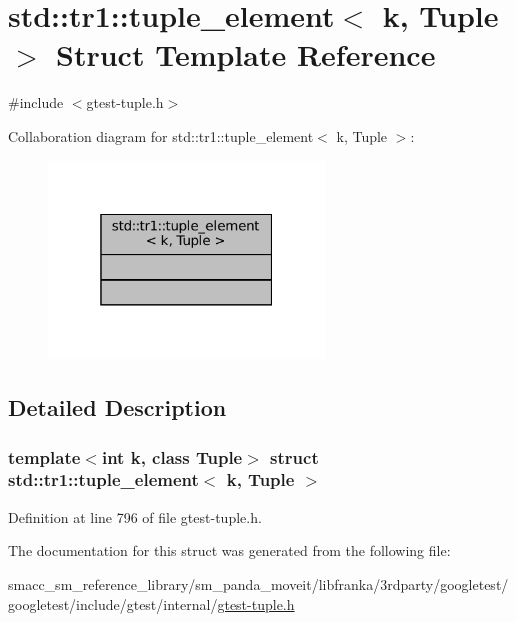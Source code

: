 \hypertarget{structstd_1_1tr1_1_1tuple__element}{}\section{std\+:\+:tr1\+:\+:tuple\+\_\+element$<$ k, Tuple $>$ Struct Template Reference}
\label{structstd_1_1tr1_1_1tuple__element}


{\ttfamily \#include $<$gtest-\/tuple.\+h$>$}



Collaboration diagram for std\+:\+:tr1\+:\+:tuple\+\_\+element$<$ k, Tuple $>$\+:
\nopagebreak
\begin{figure}[H]
\begin{center}
\leavevmode
\includegraphics[width=208pt]{structstd_1_1tr1_1_1tuple__element__coll__graph}
\end{center}
\end{figure}


\subsection{Detailed Description}
\subsubsection*{template$<$int k, class Tuple$>$\newline
struct std\+::tr1\+::tuple\+\_\+element$<$ k, Tuple $>$}



Definition at line 796 of file gtest-\/tuple.\+h.



The documentation for this struct was generated from the following file\+:\begin{DoxyCompactItemize}
\item 
smacc\+\_\+sm\+\_\+reference\+\_\+library/sm\+\_\+panda\+\_\+moveit/libfranka/3rdparty/googletest/googletest/include/gtest/internal/\hyperlink{gtest-tuple_8h}{gtest-\/tuple.\+h}\end{DoxyCompactItemize}
